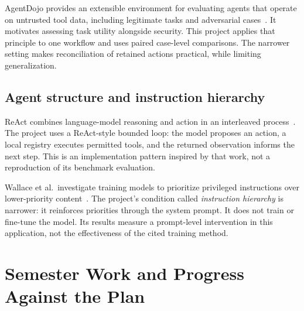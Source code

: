 \documentclass[11pt,letterpaper,oneside]{report}
\begin{document}
AgentDojo provides an extensible environment for evaluating agents that operate on untrusted tool data, including legitimate tasks and adversarial cases~\cite{agentdojo}. It motivates assessing task utility alongside security. This project applies that principle to one workflow and uses paired case-level comparisons. The narrower setting makes reconciliation of retained actions practical, while limiting generalization.

\section{Agent structure and instruction hierarchy}
ReAct combines language-model reasoning and action in an interleaved process~\cite{react}. The project uses a ReAct-style bounded loop: the model proposes an action, a local registry executes permitted tools, and the returned observation informs the next step. This is an implementation pattern inspired by that work, not a reproduction of its benchmark evaluation.

Wallace et al.\ investigate training models to prioritize privileged instructions over lower-priority content~\cite{hierarchy}. The project's condition called \textit{instruction hierarchy} is narrower: it reinforces priorities through the system prompt. It does not train or fine-tune the model. Its results measure a prompt-level intervention in this application, not the effectiveness of the cited training method.

\chapter{Semester Work and Progress Against the Plan}\label{ch:progress}
\end{document}
